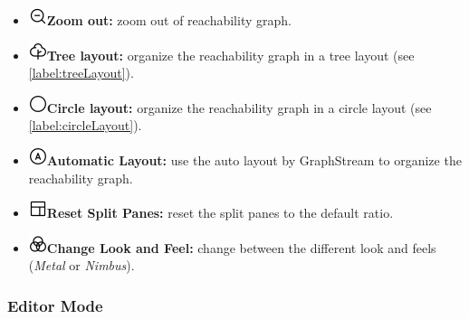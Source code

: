 \documentclass[10pt, a4paper]{article}
\begin{document}
\begin{itemize}
\item\includegraphics[scale=0.4]{../src/resources/images/Toolbar/zoom-out.png}\hspace{0.1cm}\textbf{Zoom out:} zoom out of reachability graph.
\item\includegraphics[scale=0.4]{../src/resources/images/Toolbar/tree-layout.png}\hspace{0.1cm}\textbf{Tree layout:} organize the reachability graph in a tree layout (see \ref{label:treeLayout}).
\item\includegraphics[scale=0.4]{../src/resources/images/Toolbar/circle-layout.png}\hspace{0.1cm}\textbf{Circle layout:} organize the reachability graph in a circle layout (see \ref{label:circleLayout}).
\item\includegraphics[scale=0.4]{../src/resources/images/Toolbar/auto-layout.png}\hspace{0.1cm}\textbf{Automatic Layout:} use the auto layout by GraphStream to organize the reachability graph.
\item\includegraphics[scale=0.4]{../src/resources/images/Toolbar/layout.png}\hspace{0.1cm}\textbf{Reset Split Panes:} reset the split panes to the default ratio.
\item\includegraphics[scale=0.4]{../src/resources/images/Toolbar/design.png}\hspace{0.1cm}\textbf{Change Look and Feel:} change between the different look and feels (\textit{Metal} or \textit{Nimbus}).
\end{itemize} 

\subsubsection{Editor Mode}
\label{label:editor}
\end{document}
